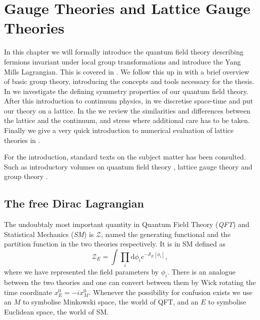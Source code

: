 
\chapter{Gauge Theories and Lattice Gauge Theories}

In this chapter we will formally introduce the quantum field theory describing
fermions invariant under local group transformations and introduce the Yang
Mills Lagrangian. This is covered in . We follow
this up in  with a brief overview of basic group theory,
introducing the concepts and tools necessary for the thesis. In
 we investigate the defining symmetry properties of our
quantum field theory. After this introduction to continuum physics, in
 we discretise space-time and put our theory on a
lattice. In the 
we review the similarities and differences between the lattice and the
continuum, and stress where additional care has to be taken. Finally we give a
very quick introduction to numerical evaluation of lattice theories in
.

For the introduction, standard texts on the subject matter has been consulted.
Such as introductory volumes on quantum field theory
\citep[e.g.][]{peskin1995introduction,maggiore2004modern}, lattice gauge theory
\citep[e.g.][]{montvay1997quantum,gattringer2009quantum} and group theory
\citep[e.g.][]{georgi1999lie,fulton2013representation}.

\section{The free Dirac Lagrangian} \label{sec-continuum_gauge}

The undoubtaly most important quantity in Quantum Field Theory (\emph{QFT}) and
Statistical Mechanics (\emph{SM}) is $\mathcal{Z}$, named the generating
functional and the partition function in the two theories respectively. It is in
SM defined as
%
\begin{equation} \label{eq-partition}
  \mathcal{Z}_E = \int \prod_i \mathrm{d} \phi_i e^{-\mathcal{S}_E[\phi_i]},
\end{equation}
%
where we have represented the field parameters by $\phi_i$. There is an analogue
between the two theories and one can convert between them by Wick rotating the
time coordinate $x^0_E = -i x^0_M$. Whenever the possibility for confusion
exists we use an $M$ to symbolise Minkowski space, the world of QFT, and an $E$
to symbolise Euclidean space, the world of SM.

